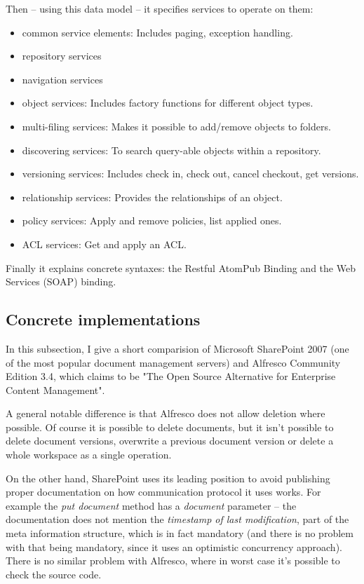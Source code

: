 Then -- using this data model -- it specifies services to operate on them:

\begin{itemize}
\item common service elements: Includes paging, exception handling.
\item repository services
\item navigation services
\item object services: Includes factory functions for different object types.
\item multi-filing services: Makes it possible to add/remove objects to folders.
\item discovering services: To search query-able objects within a repository.
\item versioning services: Includes check in, check out, cancel checkout, get
	versions.
\item relationship services: Provides the relationships of an object.
\item policy services: Apply and remove policies, list applied ones.
\item ACL services: Get and apply an ACL.
\end{itemize}

Finally it explains concrete syntaxes: the Restful AtomPub Binding and the Web
Services (SOAP) binding.

\subsection{Concrete implementations}

In this subsection, I give a short comparision of Microsoft SharePoint 2007
(one of the most popular document management servers) and Alfresco Community
Edition 3.4, which claims to be "The Open Source Alternative for Enterprise
Content Management".

A general notable difference is that Alfresco does not allow deletion where
possible. Of course it is possible to delete documents, but it isn't possible
to delete document versions, overwrite a previous document version or delete a
whole workspace as a single operation.

On the other hand, SharePoint uses its leading position to avoid publishing
proper documentation on how communication protocol it uses works. For example
the \emph{put document} method has a \emph{document} parameter -- the
documentation\cite{spdoc} does not mention the \emph{timestamp of last
modification}, part of the meta information structure, which is in fact
mandatory (and there is no problem with that being mandatory, since it uses an
optimistic concurrency approach). There is no similar problem with Alfresco,
where in worst case it's possible to check the source code.

